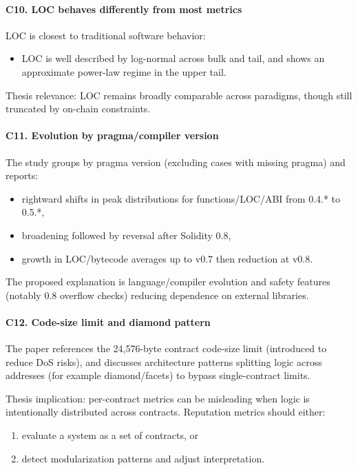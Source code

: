 \documentclass[11pt,a4paper]{article}
\begin{document}
\paragraph{C10. LOC behaves differently from most metrics}
LOC is closest to traditional software behavior:
\begin{itemize}[leftmargin=*]
  \item LOC is well described by log-normal across bulk and tail, and shows an approximate power-law regime in the upper tail.
\end{itemize}
Thesis relevance: LOC remains broadly comparable across paradigms, though still truncated by on-chain constraints.

\paragraph{C11. Evolution by pragma/compiler version}
The study groups by pragma version (excluding cases with missing pragma) and reports:
\begin{itemize}[leftmargin=*]
  \item rightward shifts in peak distributions for functions/LOC/ABI from 0.4.* to 0.5.*,
  \item broadening followed by reversal after Solidity 0.8,
  \item growth in LOC/bytecode averages up to v0.7 then reduction at v0.8.
\end{itemize}
The proposed explanation is language/compiler evolution and safety features (notably 0.8 overflow checks) reducing dependence on external libraries.

\paragraph{C12. Code-size limit and diamond pattern}
The paper references the 24,576-byte contract code-size limit (introduced to reduce DoS risks), and discusses architecture patterns splitting logic across addresses (for example diamond/facets) to bypass single-contract limits.

Thesis implication: per-contract metrics can be misleading when logic is intentionally distributed across contracts. Reputation metrics should either:
\begin{enumerate}[leftmargin=*]
  \item evaluate a system as a set of contracts, or
  \item detect modularization patterns and adjust interpretation.
\end{enumerate}
\end{document}
